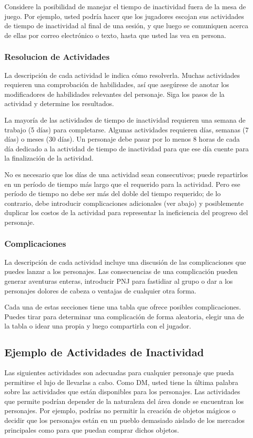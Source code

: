 \documentclass[a4paper,twocolumn,openany,10pt]{dndbook}
\begin{document}
Considere la posibilidad de manejar el tiempo de inactividad fuera de la mesa de juego. Por ejemplo, usted podría hacer que los
jugadores escojan sus actividades de tiempo de inactividad al final de una sesión, y que luego se comuniquen acerca de ellas por
correo electrónico o texto, hasta que usted las vea en persona. 

\subsubsection*{Resolucion de Actividades}
La descripción de cada actividad le indica cómo resolverla. Muchas actividades requieren una comprobación de habilidades, así
que asegúrese de anotar los modificadores de habilidades relevantes del personaje. Siga los pasos de la actividad y determine
los resultados.

La mayoría de las actividades de tiempo de inactividad requieren una semana de trabajo (5 días) para completarse. Algunas
actividades requieren días, semanas (7 días) o meses (30 días). Un personaje debe pasar por lo menos 8 horas de cada día
dedicado a la actividad de tiempo de inactividad para que ese día cuente para la finalización de la actividad.

No es necesario que los días de una actividad sean consecutivos; puede repartirlos en un período de tiempo más largo que el
requerido para la actividad. Pero ese período de tiempo no debe ser más del doble del tiempo requerido; de lo contrario, debe
introducir complicaciones adicionales (ver abajo) y posiblemente duplicar los costos de la actividad para representar la
ineficiencia del progreso del personaje. 

\subsubsection*{Complicaciones}
La descripción de cada actividad incluye una discusión de las complicaciones que puedes lanzar a los personajes. Las
consecuencias de una complicación pueden generar aventuras enteras, introducir PNJ para fastidiar al grupo o dar a los
personajes dolores de cabeza o ventajas de cualquier otra forma.

Cada una de estas secciones tiene una tabla que ofrece posibles complicaciones. Puedes tirar para determinar una complicación de
forma aleatoria, elegir una de la tabla o idear una propia y luego compartirla con el jugador. 

\subsection*{Ejemplo de Actividades de Inactividad}
Las siguientes actividades son adecuadas para cualquier personaje que pueda permitirse el lujo de llevarlas a cabo. Como DM,
usted tiene la última palabra sobre las actividades que están disponibles para los personajes. Las actividades que permite
podrían depender de la naturaleza del área donde se encuentran los personajes. Por ejemplo, podrías no permitir la creación de
objetos mágicos o decidir que los personajes están en un pueblo demasiado aislado de los mercados principales como para que
puedan comprar dichos objetos.  
\end{document}
